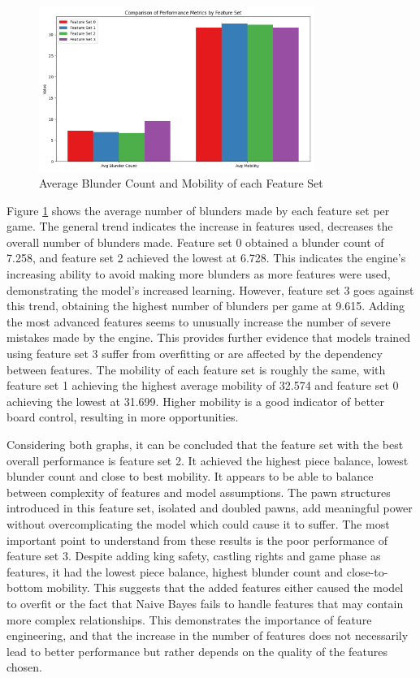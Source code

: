 \begin{figure}[H]
    \centering
    \includegraphics[width=0.8\textwidth]{images/plots/featureSet/Feature_set_vs_blunder_count_and_avg_mobility.png}
    \caption{Average Blunder Count and Mobility of each Feature Set}
    \label{fig: feature_set_vs_blunder_count_and_avg_mobility}
\end{figure}

Figure \ref{fig: feature_set_vs_blunder_count_and_avg_mobility} shows the average number of blunders made by each feature set per game. The general trend indicates the increase in features used, decreases the overall number of blunders made. Feature set 0 obtained a blunder count of 7.258, and feature set 2 achieved the lowest at 6.728. This indicates the engine's increasing ability to avoid making more blunders as more features were used, demonstrating the model's increased learning. However, feature set 3 goes against this trend, obtaining the highest number of blunders per game at 9.615. Adding the most advanced features seems to unusually increase the number of severe mistakes made by the engine. This provides further evidence that models trained using feature set 3 suffer from overfitting or are affected by the dependency between features. The mobility of each feature set is roughly the same, with feature set 1 achieving the highest average mobility of 32.574 and feature set 0 achieving the lowest at 31.699. Higher mobility is a good indicator of better board control, resulting in more opportunities. 

Considering both graphs, it can be concluded that the feature set with the best overall performance is feature set 2. It achieved the highest piece balance, lowest blunder count and close to best mobility. It appears to be able to balance between complexity of features and model assumptions. The pawn structures introduced in this feature set, isolated and doubled pawns, add meaningful power without overcomplicating the model which could cause it to suffer. The most important point to understand from these results is the poor performance of feature set 3. Despite adding king safety, castling rights and game phase as features, it had the lowest piece balance, highest blunder count and close-to-bottom mobility. This suggests that the added features either caused the model to overfit or the fact that Naive Bayes fails to handle features that may contain more complex relationships. This demonstrates the importance of feature engineering, and that the increase in the number of features does not necessarily lead to better performance but rather depends on the quality of the features chosen. 


